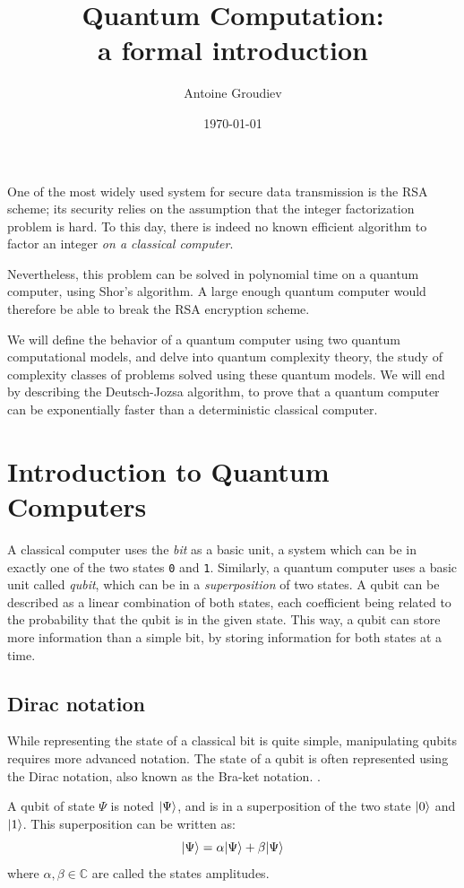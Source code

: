 \documentclass[12pt,a4paper]{article}
\title{\vspace{-5ex} \textbf{Quantum Computation:\\a formal introduction}}
\author{Antoine Groudiev}
\date{\vspace{-1ex}\today}
\theoremstyle{plain}
\theoremstyle{definition}
\DeclarePairedDelimiter\ket{\lvert}{\rangle}
\begin{document}
\maketitle
One of the most widely used system for secure data transmission is the RSA scheme; its security relies on the assumption that the integer factorization problem is hard. To this day, there is indeed no known efficient algorithm to factor an integer \textit{on a classical computer}.

Nevertheless, this problem can be solved in polynomial time on a quantum computer, using Shor's algorithm. A large enough quantum computer would therefore be able to break the RSA encryption scheme.

We will define the behavior of a quantum computer using two quantum computational models, and delve into quantum complexity theory, the study of complexity classes of problems solved using these quantum models. We will end by describing the Deutsch-Jozsa algorithm, to prove that a quantum computer can be exponentially faster than a deterministic classical computer.

\tableofcontents

\section{Introduction to Quantum Computers}
A classical computer uses the \emph{bit} as a basic unit, a system which can be in exactly one of the two states \texttt{0} and \texttt{1}. Similarly, a quantum computer uses a basic unit called \emph{qubit}, which can be in a \emph{superposition} of two states. A qubit can be described as a linear combination of both states, each coefficient being related to the probability that the qubit is in the given state. This way, a qubit can store more information than a simple bit, by storing information for both states at a time.

\subsection{Dirac notation}
While representing the state of a classical bit is quite simple, manipulating qubits requires more advanced notation. 
The state of a qubit is often represented using the Dirac notation, also known as the Bra-ket notation. \cite{dirac-notation}.

A qubit of state $\Psi$ is noted $\ket{\Psi}$, and is in a superposition of the two state $\ket{0}$ and $\ket{1}$. This superposition can be written as:
\begin{equation*}
    \ket{\Psi}=\alpha\ket{\Psi}+\beta\ket{\Psi}
\end{equation*}
where $\alpha, \beta\in \mathbb{C}$ are called the states amplitudes. 
\end{document}
